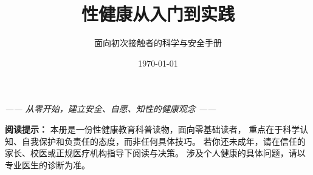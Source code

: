 \documentclass[12pt,UTF8,openany]{ctexbook}
\title{\myhei\zihao{0} 性健康从入门到实践}
\author{面向初次接触者的科学与安全手册}
\date{\today}
\begin{document}
\maketitle

\begin{center}
\itshape{}
—— 从零开始，建立安全、自愿、知性的健康观念 ——
\end{center}

\vspace{1em}

\noindent\textbf{阅读提示：} 本册是一份性健康教育科普读物，面向零基础读者，
重点在于科学认知、自我保护和负责任的态度，而非任何具体技巧。
若你还未成年，请在信任的家长、校医或正规医疗机构指导下阅读与决策。
涉及个人健康的具体问题，请以专业医生的诊断为准。

\tableofcontents



\end{document}
